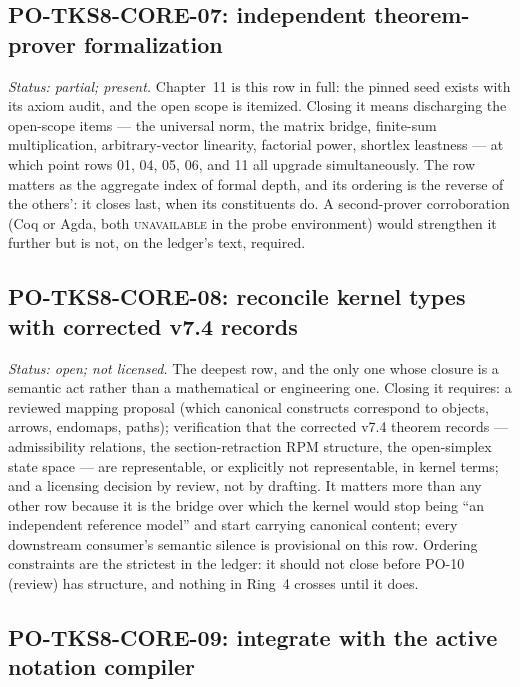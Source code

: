 \subsection{PO-TKS8-CORE-07: independent theorem-prover formalization}

\emph{Status: partial; present.} Chapter~11 is this row in full: the
pinned seed exists with its axiom audit, and the open scope is
itemized. Closing it means discharging the open-scope items --- the
universal norm, the matrix bridge, finite-sum multiplication,
arbitrary-vector linearity, factorial power, shortlex leastness ---
at which point rows 01, 04, 05, 06, and 11 all upgrade
simultaneously. The row matters as the aggregate index of formal
depth, and its ordering is the reverse of the others': it closes
last, when its constituents do. A second-prover corroboration (Coq
or Agda, both \textsc{unavailable} in the probe environment) would
strengthen it further but is not, on the ledger's text, required.

\subsection{PO-TKS8-CORE-08: reconcile kernel types with corrected v7.4 records}

\emph{Status: open; not licensed.} The deepest row, and the only one
whose closure is a semantic act rather than a mathematical or
engineering one. Closing it requires: a reviewed mapping proposal
(which canonical constructs correspond to objects, arrows, endomaps,
paths); verification that the corrected v7.4 theorem records ---
admissibility relations, the section-retraction RPM structure, the
open-simplex state space --- are representable, or explicitly not
representable, in kernel terms; and a licensing decision by review,
not by drafting. It matters more than any other row because it is
the bridge over which the kernel would stop being ``an independent
reference model'' and start carrying canonical content; every
downstream consumer's semantic silence is provisional on this row.
Ordering constraints are the strictest in the ledger: it should not
close before PO-10 (review) has structure, and nothing in Ring~4
crosses until it does.

\subsection{PO-TKS8-CORE-09: integrate with the active notation compiler}

